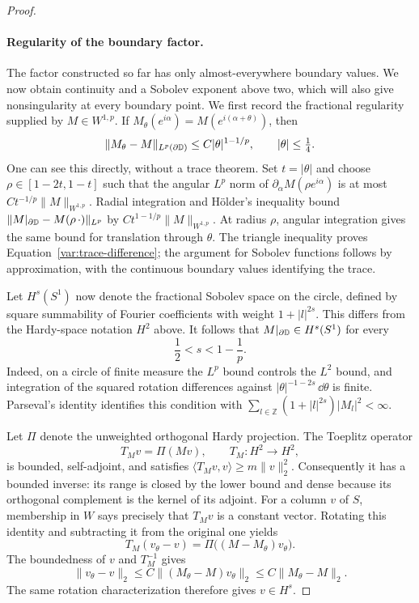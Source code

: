 \begin{proof}
\paragraph{Regularity of the boundary factor.}
The factor constructed so far has only almost-everywhere boundary
values. We now obtain continuity and a Sobolev exponent above two,
which will also give nonsingularity at every boundary point.
We first record the fractional regularity supplied by $M\in W^{1,p}$.
If $M_\theta(e^{i\alpha})=M(e^{i(\alpha+\theta)})$, then
\begin{equation}\label{var:trace-difference}
 \|M_\theta-M\|_{L^p(\partial\mathbb D)}
       \le C|\theta|^{1-1/p},\qquad |\theta|\le\tfrac14.
\end{equation}
One can see this directly, without a trace theorem.  Set
$t=|\theta|$ and choose $\rho\in[1-2t,1-t]$ such that the angular
$L^p$ norm of $\partial_\alpha M(\rho e^{i\alpha})$ is at most
$Ct^{-1/p}\|M\|_{W^{1,p}}$.  Radial integration and H\"older's
inequality bound
$\|M|_{\partial\mathbb D}-M(\rho\,\cdot)\|_{L^p}$ by
$Ct^{1-1/p}\|M\|_{W^{1,p}}$.  At radius $\rho$, angular integration
gives the same bound for translation through $\theta$.  The triangle
inequality proves Equation~\eqref{var:trace-difference}; the argument
for Sobolev functions follows by approximation, with the continuous
boundary values identifying the trace.

Let $H^s(S^1)$ now denote the fractional Sobolev space on the circle,
defined by square summability of Fourier coefficients with weight
$1+|l|^{2s}$. This differs from the Hardy-space notation $H^2$ above.
It follows that $M|_{\partial\mathbb D}\in H^s(S^1)$ for every
\begin{equation}\label{var:s-choice}
 \frac12<s<1-\frac1p.
\end{equation}
Indeed, on a circle of finite measure the $L^p$ bound controls the
$L^2$ bound, and integration of the squared rotation differences
against $|\theta|^{-1-2s}\,\dd\theta$ is finite.  Parseval's identity
identifies this condition with
$\sum_{l\in\mathbb Z}(1+|l|^{2s})|M_l|^2<\infty$.

Let $\Pi$ denote the unweighted orthogonal Hardy projection.  The
Toeplitz operator
\[
 T_Mv=\Pi(Mv),\qquad T_M\colon H^2\longrightarrow H^2,
\]
is bounded, self-adjoint, and satisfies
$\langle T_Mv,v\rangle\ge m\|v\|_2^2$.  Consequently it has a
bounded inverse: its range is closed by the lower bound and dense
because its orthogonal complement is the kernel of its adjoint.
For a column $v$ of $S$, membership in $W$ says precisely that
$T_Mv$ is a constant vector.  Rotating this identity and subtracting
it from the original one yields
\[
 T_M(v_\theta-v)=\Pi\bigl((M-M_\theta)v_\theta\bigr).
\]
The boundedness of $v$ and $T_M^{-1}$ gives
\begin{equation}\label{var:factor-difference}
 \|v_\theta-v\|_2
 \le C\|(M_\theta-M)v_\theta\|_2
 \le C\|M_\theta-M\|_2.
\end{equation}
The same rotation characterization therefore gives $v\in H^s$.


\end{proof}
